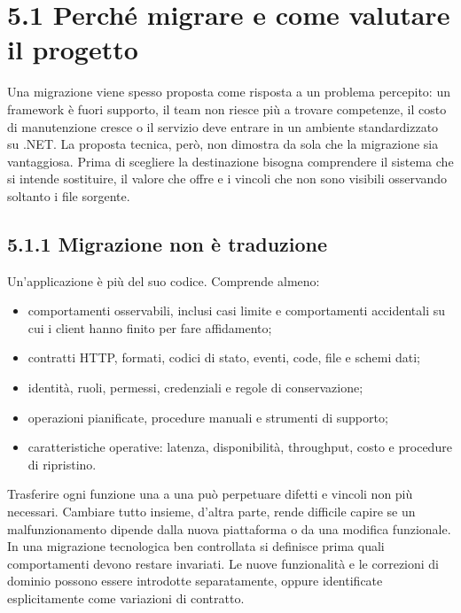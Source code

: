 \documentclass[
  italian,
  10pt,
]{book}
\providecommand{\tightlist}{%
  \setlength{\itemsep}{0pt}\setlength{\parskip}{0pt}}
\begin{document}
\section{5.1 Perché migrare e come valutare il
progetto}\label{perchuxe9-migrare-e-come-valutare-il-progetto}

Una migrazione viene spesso proposta come risposta a un problema
percepito: un framework è fuori supporto, il team non riesce più a
trovare competenze, il costo di manutenzione cresce o il servizio deve
entrare in un ambiente standardizzato su .NET. La proposta tecnica,
però, non dimostra da sola che la migrazione sia vantaggiosa. Prima di
scegliere la destinazione bisogna comprendere il sistema che si intende
sostituire, il valore che offre e i vincoli che non sono visibili
osservando soltanto i file sorgente.

\subsection{5.1.1 Migrazione non è
traduzione}\label{migrazione-non-uxe8-traduzione}

Un'applicazione è più del suo codice. Comprende almeno:

\begin{itemize}
\tightlist
\item
  comportamenti osservabili, inclusi casi limite e comportamenti
  accidentali su cui i client hanno finito per fare affidamento;
\item
  contratti HTTP, formati, codici di stato, eventi, code, file e schemi
  dati;
\item
  identità, ruoli, permessi, credenziali e regole di conservazione;
\item
  operazioni pianificate, procedure manuali e strumenti di supporto;
\item
  caratteristiche operative: latenza, disponibilità, throughput, costo e
  procedure di ripristino.
\end{itemize}

Trasferire ogni funzione una a una può perpetuare difetti e vincoli non
più necessari. Cambiare tutto insieme, d'altra parte, rende difficile
capire se un malfunzionamento dipende dalla nuova piattaforma o da una
modifica funzionale. In una migrazione tecnologica ben controllata si
definisce prima quali comportamenti devono restare invariati. Le nuove
funzionalità e le correzioni di dominio possono essere introdotte
separatamente, oppure identificate esplicitamente come variazioni di
contratto.
\end{document}
